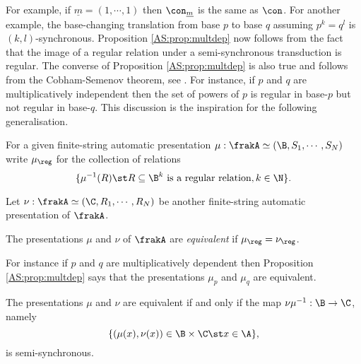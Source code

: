 For example, if $\underline{m} = (1,\cdots, 1)$ then $\con_{\underline{m}}$ is the same as $\con$.
For another example, the base-changing translation from base $p$ to base $q$ assuming $p^k = q^l$ is $(k,l)$-synchronous. Proposition \ref{AS:prop:multdep} now follows
from the fact that the image of a regular relation under a semi-synchronous transduction is regular. The converse of Proposition \ref{AS:prop:multdep} is also true and follows from the Cobham-Semenov theorem, see \cite{BHMCV94}. For instance, if $p$ and $q$ are multiplicatively independent then the set of powers of $p$ is regular in base-$p$ but not
regular in base-$q$. This discussion is the inspiration for the following generalisation.

For a given finite-string automatic presentation $\mu:\frakA \simeq (\B,S_1,\cdots,S_N)$ 
write $\mu_{\reg}$ for the collection of relations
$$
\{\mu^{-1}(R) \st R \subseteq \B^k \text{ is a regular relation}, k \in \N\}.
$$

Let $\nu:\frakA \simeq (\C,R_1,\cdots,R_N)$ be another finite-string automatic presentation of $\frakA$.

\begin{definition} \cite{Bara06}
The presentations  $\mu$ and $\nu$ of $\frakA$ are {\em equivalent} if $\mu_{\reg}  = \nu_{\reg}$.
\end{definition}

For instance if $p$ and $q$ are multiplicatively dependent then Proposition \ref{AS:prop:multdep} says that the presentations $\mu_p$ and $\mu_q$ are equivalent.

\begin{theorem} \cite{Bara06}
The presentations $\mu$ and $\nu$ are equivalent if and only if the map $\nu \mu^{-1}:\B \to \C$, namely
 \[
  \{(\mu(x), \nu(x)) \in \B \times \C\st x \in \A\},
 \]
is semi-synchronous.
\end{theorem}

